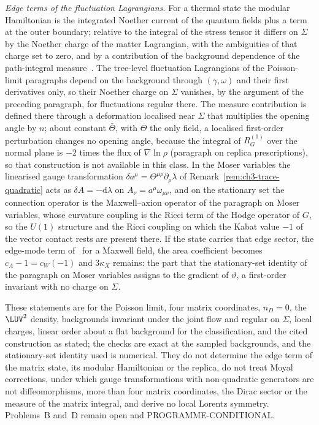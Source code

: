 \emph{Edge terms of the fluctuation Lagrangians.} For a thermal state the modular Hamiltonian is the integrated Noether current of the quantum fields plus a term at the outer boundary; relative to the integral of the stress tensor it differs on \(\Sigma\) by the Noether charge of the matter Lagrangian, with the ambiguities of that charge set to zero, and by a contribution of the background dependence of the path-integral measure~\cite{Chen2022}. The tree-level fluctuation Lagrangians of the Poisson-limit paragraphs depend on the background through \((\gamma,\omega)\) and their first derivatives only, so their Noether charge on \(\Sigma\) vanishes, by the argument of the preceding paragraph, for fluctuations regular there. The measure contribution is defined there through a deformation localised near \(\Sigma\) that multiplies the opening angle by \(n\); about constant \(\bar\Theta\), with \(\Theta\) the only field, a localised first-order perturbation changes no opening angle, because the integral of \(R_G^{(1)}\) over the normal plane is \(-2\) times the flux of \(\nabla\ln\rho\) (paragraph on replica prescriptions), so that construction is not available in this class. In the Moser variables the linearised gauge transformation \(\delta a^\mu=\Theta^{\mu\rho}\partial_\rho\lambda\) of Remark~\ref{rem:ch3-trace-quadratic} acts as \(\delta A=-\mathrm d\lambda\) on \(A_\nu=a^\mu\omega_{\mu\nu}\), and on the stationary set the connection operator is the Maxwell--axion operator of the paragraph on Moser variables, whose curvature coupling is the Ricci term of the Hodge operator of \(G\), so the \(U(1)\) structure and the Ricci coupling on which the Kabat value \(-1\) of the vector contact rests are present there. If the state carries that edge sector, the edge-mode term of~\cite{DonnellyWall2016} for a Maxwell field, the area coefficient becomes \(c_A-1=c_W(-1)\) and \(3\kappa_X\) remains: the part that the stationary-set identity of the paragraph on Moser variables assigns to the gradient of \(\vartheta\), a first-order invariant with no charge on \(\Sigma\).

These statements are for the Poisson limit, four matrix coordinates, \(n_D=0\), the \(\LUV^2\) density, backgrounds invariant under the joint flow and regular on \(\Sigma\), local charges, linear order about a flat background for the classification, and the cited construction as stated; the checks are exact at the sampled backgrounds, and the stationary-set identity used is numerical. They do not determine the edge term of the matrix state, its modular Hamiltonian or the replica, do not treat Moyal corrections, under which gauge transformations with non-quadratic generators are not diffeomorphisms, more than four matrix coordinates, the Dirac sector or the measure of the matrix integral, and derive no local Lorentz symmetry. Problems~B and~D remain open and PROGRAMME-CONDITIONAL.
